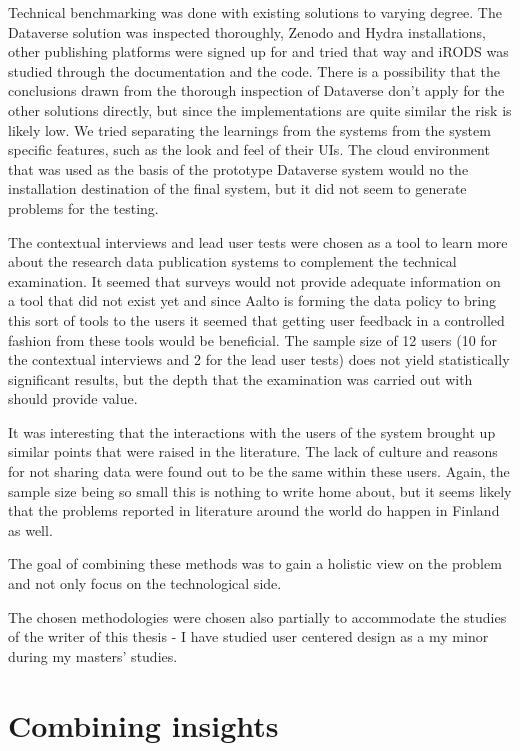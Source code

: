 Technical benchmarking was done with existing solutions to varying degree.
The Dataverse solution was inspected thoroughly, Zenodo and Hydra installations,
other publishing platforms were signed up for and tried that way and iRODS
was studied through the documentation and the code. There is a possibility
that the conclusions drawn from the thorough inspection of Dataverse don't
apply for the other solutions directly, but since the implementations are quite
similar the risk is likely low. We tried separating the learnings from the
systems from the system specific features, such as the look and feel of their
UIs. The cloud environment that was used as the basis of the prototype
Dataverse system would no the installation destination of the final system,
but it did not seem to generate problems for the testing.

The contextual interviews and lead user tests were chosen as a tool to learn
more about the research data publication systems to complement the technical
examination. It seemed that surveys would not provide adequate information on
a tool that did not exist yet and since Aalto is forming the data policy to
bring this sort of tools to the users it seemed that getting user feedback
in a controlled fashion from these tools would be beneficial. The sample size
of 12 users (10 for the contextual interviews and 2 for the lead user tests)
does not yield statistically significant results, but the depth that the
examination was carried out with should provide value.

It was interesting that the interactions with the users of the system brought
up similar points that were raised in the literature. The lack of culture and
reasons for not sharing data were found out to be the same within these users.
Again, the sample size being so small this is nothing to write home about, but
it seems likely that the problems reported in literature around the world do
happen in Finland as well.

The goal of combining these methods was to gain a holistic view on the problem
and not only focus on the technological side.

The chosen methodologies were chosen also partially to accommodate the studies
of the writer of this thesis - I have studied user centered design as a my
minor during my masters' studies.

\section{Combining insights}

